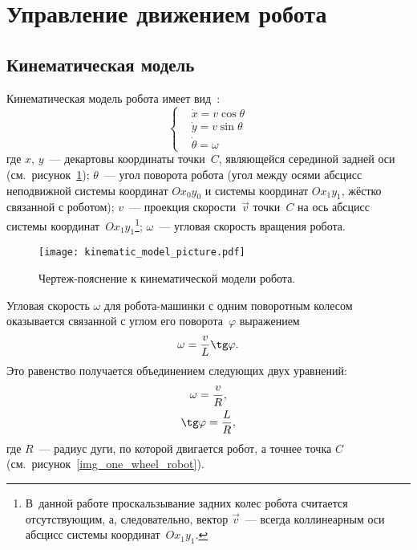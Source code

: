 \newpage
\section{Управление движением робота}
\subsection{Кинематическая модель}
Кинематическая модель робота имеет вид~\cite{survey}:
\begin{equation}\label{eq_robot_kinematic_model}
    \left\{
    \begin{aligned}
        & \dot{x} = v \cos \theta \\
        & \dot{y} = v \sin \theta \\
        & \dot{\theta} = \omega
    \end{aligned}
    \right.
\end{equation}
где $x$, $y$~--- декартовы координаты точки~$C$, являющейся серединой задней оси (см.~рисунок~\ref{img_kinematic_model_picture}); $\theta$~--- угол поворота робота (угол между осями абсцисс неподвижной системы координат $Ox_0y_0$ и системы координат $Ox_1y_1$, жёстко связанной с роботом); $v$~--- проекция скорости~$\vec{v}$ точки~$C$ на ось абсцисс системы координат~$Ox_1y_1$\!\footnote{В~данной работе проскальзывание задних колес робота считается отсутствующим, а, следовательно, вектор $\vec{v}$~--- всегда коллинеарным оси абсцисс системы координат~$Ox_1y_1$.}; $\omega$~--- угловая скорость вращения робота.

\begin{figure}[h]
    \centering
    \texttt{[image: kinematic\_model\_picture.pdf]}
    \caption{Чертеж-пояснение к кинематической модели робота.}
    \label{img_kinematic_model_picture}
\end{figure}

Угловая скорость $\omega$ для робота-машинки с одним поворотным колесом оказывается связанной с углом его поворота~$\varphi$ выражением~\cite{survey}
\begin{equation}\label{eq_omega_of_phi}
    \omega = \frac{v}{L} \tg\varphi\ldotp
\end{equation}
Это равенство получается объединением следующих двух уравнений:
\begin{gather}
    \omega = \frac{v}{R}, \\
    \tg\varphi = \frac{L}{R} \label{eq_tg_phi},
\end{gather}
где $R$~--- радиус дуги, по которой двигается робот, а точнее точка $C$ (см.~рисунок~\ref{img_one_wheel_robot}).

